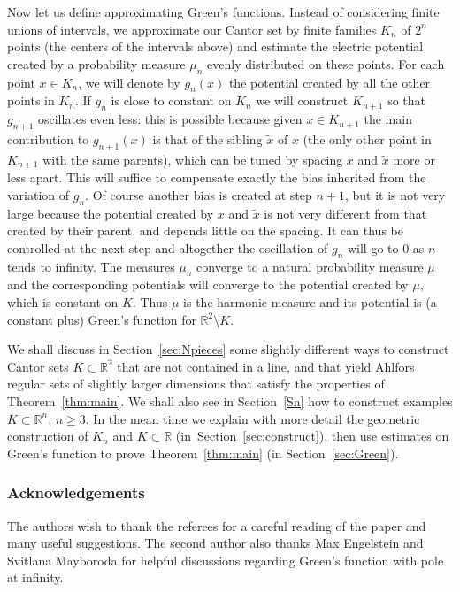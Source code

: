 \documentclass[JEP,XML,SOM,Unicode,published]{cedram}
\let\sm\setminus
\let\wt\widetilde
\numberwithin{equation}{section}
\theoremstyle{plain}
\theoremstyle{definition}
\newcommand{\R}{\mathbb{R}}
\let\sm\setminus
\newcommand{\R}{\mathbb{R}}
\begin{document}
Now let us define approximating Green's functions. Instead of considering finite unions of intervals,
we approximate our Cantor set by finite families $K_n$ of $2^n$ points (the centers of the intervals above)
and estimate the electric potential created by a probability measure $\mu_n$ evenly distributed on these points.
For each point $x\in K_n$, we will denote by $g_n(x)$ the potential created by all the other points in $K_n$.
If $g_n$ is close to constant on $K_n$ we will construct $K_{n+1}$ so that $g_{n+1}$ oscillates even less: this is possible because given $x\in K_{n+1}$ the main contribution to $g_{n+1}(x)$ is that of the sibling $\wt x$ of $x$ (the only other point in $K_{n+1}$ with the same parents), which can be tuned by spacing $x$ and $\wt x$ more or less apart. This will suffice
to compensate exactly the bias inherited from the variation of $g_n$. Of course another bias is created at step $n+1$, but it is not very large because the potential created by $x$ and $\wt x$ is not very different from that created by their parent, and depends little on the spacing. It can thus be controlled at the next step and altogether the oscillation of $g_n$ will go to $0$
as $n$ tends to infinity.
The measures $\mu_n$ converge to a natural probability measure $\mu$ and the corresponding potentials will
converge to the potential created by $\mu$, which is constant on $K$.
Thus $\mu$ is the harmonic measure and its potential is (a constant plus) Green's
function for $\R^2\sm K$.

We shall discuss in Section~\ref{sec:Npieces}
some slightly different ways to construct Cantor sets $K \subset \R^2$ that are not contained in a line,
and that yield Ahlfors regular sets of slightly larger dimensions that satisfy the properties of Theorem~\ref{thm:main}.
We shall also see in Section~\ref{Sn} how to construct examples $K \subset \R^n$, $n \geq 3$. In the
mean time we explain with more detail the geometric construction of $K_n$ and $K \subset \R$
(in~Sec\-tion~\ref{sec:construct}), then use estimates on Green's function to prove
Theorem~\ref{thm:main} (in Section~\ref{sec:Green}).

\subsubsection*{Acknowledgements}
The authors wish to thank the referees for a careful reading of the paper and many useful suggestions. The second author also thanks Max Engelstein and Svitlana Mayboroda for helpful discussions regar\-ding Green's function with pole at infinity.
\end{document}
